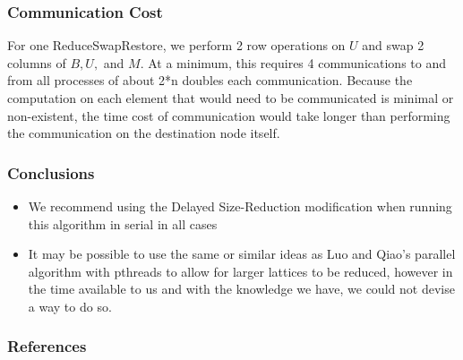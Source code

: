 \documentclass{beamer}
\begin{document}
\begin{frame}
\frametitle{Communication Cost}
For one ReduceSwapRestore, we perform 2 row operations on $U$ and swap 2 columns of $B,U,$ and $M$.
At a minimum, this requires 4 communications to and from all processes  of about 2*n doubles each communication.
Because the computation on each element that would need to be communicated is minimal or non-existent, the time cost of communication would take longer than performing the communication on the destination node itself.
\end{frame}
\begin{frame}
\frametitle{Conclusions}
\begin{itemize}
\item We recommend using the Delayed Size-Reduction modification when running this algorithm in serial in all cases
\item It may be possible to use the same or similar ideas as Luo and Qiao's parallel algorithm with pthreads to allow for larger lattices to be reduced, however in the time available to us and with the knowledge we have, we could not devise a way to do so.
\end{itemize}
\end{frame}

\begin{frame}
\frametitle{References}

\end{frame}
\end{document}
